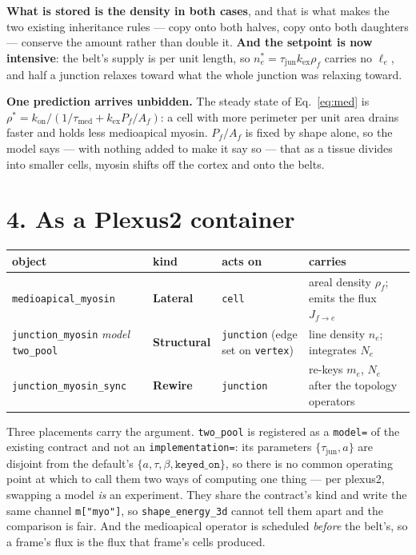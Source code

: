 \documentclass[10pt,a4paper]{article}
\newcommand{\code}[1]{\texttt{#1}}
\begin{document}
\textbf{What is stored is the density in both cases}, and that is what makes the two existing
inheritance rules --- copy onto both halves, copy onto both daughters --- conserve the amount rather
than double it. \textbf{And the setpoint is now intensive}: the belt's supply is per unit length, so
$n_e^{\ast}=\tau_{\text{jun}}k_{\text{ex}}\rho_f$ carries no $\ell_e$, and half a junction relaxes
toward what the whole junction was relaxing toward.

\textbf{One prediction arrives unbidden.} The steady state of Eq.~\eqref{eq:med} is
$\rho^{\ast}=k_{\text{on}}/(1/\tau_{\text{med}}+k_{\text{ex}}P_f/A_f)$: a cell with more perimeter per
unit area drains faster and holds less medioapical myosin. $P_f/A_f$ is fixed by shape alone, so the
model says --- with nothing added to make it say so --- that as a tissue divides into smaller cells,
myosin shifts off the cortex and onto the belts.

\section*{4.\; As a Plexus2 container}

\begin{center}\small
\begin{tabular}{@{}llll@{}}\toprule
object & kind & acts on & carries\\\midrule
\code{medioapical\_myosin} & \textbf{Lateral} & \code{cell} & areal density $\rho_f$; emits the flux
$J_{f\to e}$\\
\code{junction\_myosin} \emph{model} \code{two\_pool} & \textbf{Structural} & \code{junction} (edge set
on \code{vertex}) & line density $n_e$; integrates $N_e$\\
\code{junction\_myosin\_sync} & \textbf{Rewire} & \code{junction} & re-keys $m_e$, $N_e$ after the
topology operators\\
\bottomrule
\end{tabular}
\end{center}

Three placements carry the argument. \code{two\_pool} is registered as a \code{model=} of the existing
contract and not an \code{implementation=}: its parameters $\{\tau_{\text{jun}},a\}$ are disjoint from
the default's $\{a,\tau,\beta,\code{keyed\_on}\}$, so there is no common operating point at which to
call them two ways of computing one thing --- per plexus2, swapping a model \emph{is} an experiment.
They share the contract's kind and write the same channel \code{m["myo"]}, so \code{shape\_energy\_3d}
cannot tell them apart and the comparison is fair. And the medioapical operator is scheduled
\emph{before} the belt's, so a frame's flux is the flux that frame's cells produced.
\end{document}
